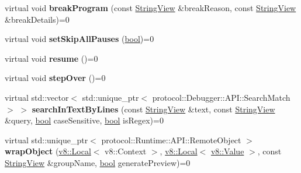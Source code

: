 \begin{DoxyCompactItemize}
virtual void {\bfseries break\+Program} (const \mbox{\hyperlink{classv8__inspector_1_1StringView}{String\+View}} \&break\+Reason, const \mbox{\hyperlink{classv8__inspector_1_1StringView}{String\+View}} \&break\+Details)=0
\item 
\mbox{\label{classv8__inspector_1_1V8InspectorSession_ae98e6ad6dd45492ce828737f7176b501}} 
virtual void {\bfseries set\+Skip\+All\+Pauses} (\mbox{\hyperlink{classbool}{bool}})=0
\item 
\mbox{\label{classv8__inspector_1_1V8InspectorSession_ace573efed7184ee701f06cb2543d4e15}} 
virtual void {\bfseries resume} ()=0
\item 
\mbox{\label{classv8__inspector_1_1V8InspectorSession_aa419715baf430ebac1673160251715db}} 
virtual void {\bfseries step\+Over} ()=0
\item 
\mbox{\label{classv8__inspector_1_1V8InspectorSession_acaa137f90ce833744a2a16bda60490c5}} 
virtual std\+::vector$<$ std\+::unique\+\_\+ptr$<$ protocol\+::\+Debugger\+::\+A\+P\+I\+::\+Search\+Match $>$ $>$ {\bfseries search\+In\+Text\+By\+Lines} (const \mbox{\hyperlink{classv8__inspector_1_1StringView}{String\+View}} \&text, const \mbox{\hyperlink{classv8__inspector_1_1StringView}{String\+View}} \&query, \mbox{\hyperlink{classbool}{bool}} case\+Sensitive, \mbox{\hyperlink{classbool}{bool}} is\+Regex)=0
\item 
\mbox{\label{classv8__inspector_1_1V8InspectorSession_a7568a840a4c681cbca9ec7ad50aba0e6}} 
virtual std\+::unique\+\_\+ptr$<$ protocol\+::\+Runtime\+::\+A\+P\+I\+::\+Remote\+Object $>$ {\bfseries wrap\+Object} (\mbox{\hyperlink{classv8_1_1Local}{v8\+::\+Local}}$<$ v8\+::\+Context $>$, \mbox{\hyperlink{classv8_1_1Local}{v8\+::\+Local}}$<$ \mbox{\hyperlink{classv8_1_1Value}{v8\+::\+Value}} $>$, const \mbox{\hyperlink{classv8__inspector_1_1StringView}{String\+View}} \&group\+Name, \mbox{\hyperlink{classbool}{bool}} generate\+Preview)=0
\item 
\mbox{\label{classv8__inspector_1_1V8InspectorSession_adbe69bb66c76882db82482db3712b554}} 

\end{DoxyCompactItemize}
